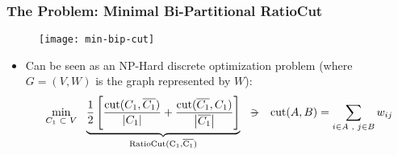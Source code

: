 \begin{frame}
  \frametitle{The Problem: Minimal Bi-Partitional RatioCut}
  \begin{figure}
    \centering
    \texttt{[image: min-bip-cut]}
  \end{figure}
  \begin{itemize}
  \item Can be seen as an NP-Hard discrete optimization problem (where $G = (V,W)$ is the graph represented by $W$):
    \begin{equation*}
      \min\limits_{\tiny{C_1 \ds{\subset} V}} \ds{}
      \underbrace{      
        \frac{1}{2}
        \left[
          \dfrac{\func{cut}(C_1,\stcomp{C_1})}{\abs{C_1}} +
          \dfrac{\func{cut}(\stcomp{C_1},C_1)}{\abs{\stcomp{C_1}}}
          \right]
        }_{\func{RatioCut(C_1,\stcomp{C_1})}}
      \ds{\suchthat}
      \func{cut}(A,B) = \sum\limits_{\tiny{i \in A \ds{,} j \in B}} w_{ij}
    \end{equation*}
  \end{itemize}
\end{frame}
